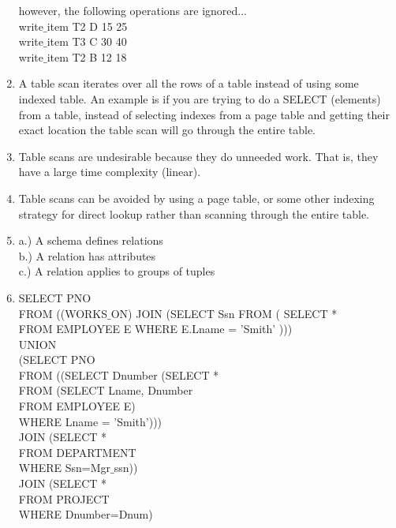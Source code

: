 \documentclass[12pt]{article}
\begin{document}
\begin{enumerate}
however, the following operations are ignored...\\
write$\_$item T2 D 15 25\\
write$\_$item T3 C 30 40\\
write$\_$item T2 B 12 18

	\item A table scan iterates over all the rows of a table instead of using some indexed table. An example is if you are trying to do a SELECT (elements) from a table,
instead of selecting indexes from a page table and getting their exact location the table scan will go through the entire table.

	\item Table scans are undesirable because they do unneeded work. That is, they have a large time complexity (linear).
	
	\item Table scans can be avoided by using a page table, or some other indexing strategy for direct lookup rather than scanning through the entire table.
	
	\item a.) A schema defines relations\\
b.) A relation has attributes\\
c.) A relation applies to groups of tuples
 	
 	\item  SELECT PNO\\
  \tabto{1cm}FROM ((WORKS$\_$ON) JOIN (SELECT Ssn FROM ( SELECT *\\
                           \tabto{2cm}FROM EMPLOYEE E WHERE E.Lname = 'Smith' )))\\
                           \tabto{2cm}UNION\\
                           \tabto{2cm}(SELECT PNO\\
                             \tabto{3cm} FROM ((SELECT Dnumber (SELECT *\\
                                       \tabto{3cm}FROM (SELECT Lname, Dnumber\\
                                         \tabto{4cm}      FROM EMPLOYEE E)\\
                                              \tabto{4cm}WHERE Lname = 'Smith')))\\
                                             \tabto{4cm} JOIN (SELECT *\\
                                                 \tabto{3cm}     FROM DEPARTMENT\\
                                                 \tabto{3cm}    WHERE Ssn=Mgr$\_$ssn))\\
                                                 \tabto{3cm}   JOIN (SELECT *\\
                                                  \tabto{2cm}         FROM PROJECT\\
                                                     \tabto{1cm}       WHERE Dnumber=Dnum)\\


\end{enumerate}
\end{document}
